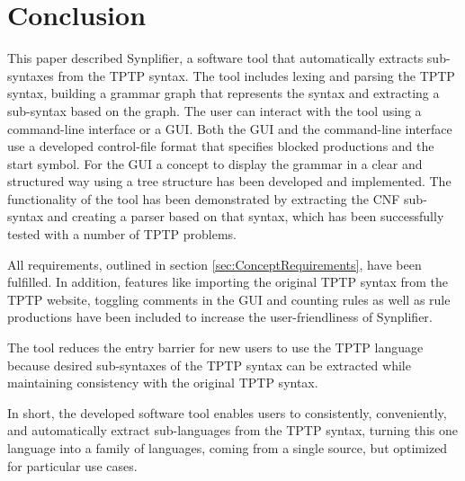 
\chapter{Conclusion}\label{cha:Conclusion}

This paper described \ac{Synplifier}, a software tool that automatically extracts sub-syntaxes from the \ac{TPTP} syntax. 
The tool includes lexing and parsing the \ac{TPTP} syntax, building a grammar graph that represents the syntax and extracting a sub-syntax based on the graph.
The user can interact with the tool using a command-line interface or a GUI.
Both the GUI and the command-line interface use a developed control-file format that specifies blocked productions and the start symbol.
For the GUI a concept to display the grammar in a clear and structured way using a tree structure has been developed and implemented.
The functionality of the tool has been demonstrated by extracting the \ac{CNF} sub-syntax and creating a parser based on that syntax, which has been successfully tested with a number of \ac{TPTP} problems.

All requirements, outlined in section \ref{sec:ConceptRequirements}, have been fulfilled.
In addition, features like importing the original \ac{TPTP} syntax from the \ac{TPTP} website, toggling comments in the GUI and counting rules as well as rule productions have been included to increase the user-friendliness of \ac{Synplifier}.

The tool reduces the entry barrier for new users to use the \ac{TPTP} language because desired sub-syntaxes of the \ac{TPTP} syntax can be extracted while maintaining consistency with the original \ac{TPTP} syntax.

In short, the developed software tool enables users to consistently, conveniently, and automatically extract sub-languages from the \ac{TPTP} syntax, turning this one language into a family of languages, coming from a single source, but optimized for particular use cases.



